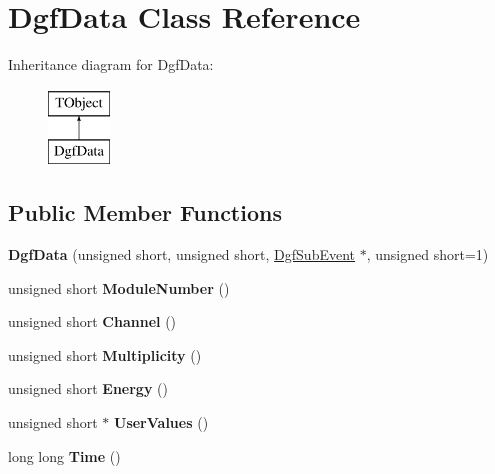 \hypertarget{class_dgf_data}{}\section{Dgf\+Data Class Reference}
\label{class_dgf_data}
Inheritance diagram for Dgf\+Data\+:\begin{figure}[H]
\begin{center}
\leavevmode
\includegraphics[height=2.000000cm]{class_dgf_data}
\end{center}
\end{figure}
\subsection*{Public Member Functions}
\begin{DoxyCompactItemize}
\item 
\mbox{\label{class_dgf_data_a920d0f59bab2274d5e4ef3e80ea1a79e}} 
{\bfseries Dgf\+Data} (unsigned short, unsigned short, \hyperlink{class_dgf_sub_event}{Dgf\+Sub\+Event} $\ast$, unsigned short=1)
\item 
\mbox{\label{class_dgf_data_a55d760ffcd84c99875532506563393eb}} 
unsigned short {\bfseries Module\+Number} ()
\item 
\mbox{\label{class_dgf_data_a37c740809015bde32af4220d15616b89}} 
unsigned short {\bfseries Channel} ()
\item 
\mbox{\label{class_dgf_data_adbf9d6108fb3a0a79d119d941a3604ac}} 
unsigned short {\bfseries Multiplicity} ()
\item 
\mbox{\label{class_dgf_data_a7cb7c0ac2a7553f9cb5512e781eb8d75}} 
unsigned short {\bfseries Energy} ()
\item 
\mbox{\label{class_dgf_data_a63542c903350303507d6f07f900660f6}} 
unsigned short $\ast$ {\bfseries User\+Values} ()
\item 
\mbox{\label{class_dgf_data_a836a43c2de36765b3a6acd16907b47e2}} 
long long {\bfseries Time} ()
\end{DoxyCompactItemize}
